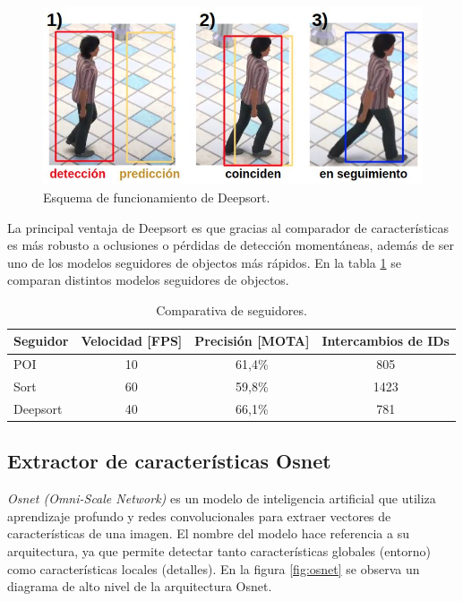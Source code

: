 \begin{figure}[ht]
	\centering
	\includegraphics[scale=.65]{./Figures/deepsortProcess.jpg}
	\caption{Esquema de funcionamiento de Deepsort.}
	\label{fig:deepsortProcess}
\end{figure}

La principal ventaja de Deepsort es que gracias al comparador de características es más robusto a oclusiones o pérdidas de detección momentáneas, además de ser uno de los modelos seguidores de objectos más rápidos. En la tabla \ref{tab:comparativaSeguidores} se comparan distintos modelos seguidores de objectos.

\begin{table}[h]
	\centering
	\caption[Comparativa de seguidores]{Comparativa de seguidores.}
	\begin{tabular}{l c c c}    
		\toprule
		\textbf{Seguidor} & \textbf{Velocidad [FPS]}  & \textbf{Precisión [MOTA]} & \textbf{Intercambios de IDs} \\
		\midrule
		POI & 10 & 61,4\% & 805 \\
		Sort & 60 & 59,8\% & 1423 \\
		Deepsort & 40 & 66,1\% & 781 \\
		\bottomrule
		\hline
	\end{tabular}
	\label{tab:comparativaSeguidores}
\end{table}

\newpage

\subsection{Extractor de características Osnet}
\label{sec:exactorOsnet}

\textit{Osnet (Omni-Scale Network)} \citep{OSNET} es un modelo de inteligencia artificial que utiliza aprendizaje profundo y redes convolucionales para extraer vectores de características de una imagen. El nombre del modelo hace referencia a su arquitectura, ya que permite detectar tanto características globales (entorno) como características locales (detalles). En la figura \ref{fig:osnet} se observa un diagrama de alto nivel de la arquitectura Osnet.

